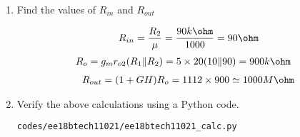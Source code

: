\begin{enumerate}[label=\thesection.\arabic*.,ref=\thesection.\theenumi]
\item
Find the values of $R_{in}$ and $R_{out}$

\solution
\begin{align}
    R_{in}=\frac{R_{2}}{\mu}=\frac{90k\ohm}{1000}=90\ohm
\end{align}
\begin{align}
    R_{o} &=g_{m} r_{o 2}(R_{1} \| R_{2}) =5 \times 20(10 \| 90)=900k\ohm
\end{align}
\begin{align}
    R_{out}=(1+GH) R_{o}=1112 \times 900 \simeq 1000M\ohm
\end{align}

\begin{table}[!ht]
\centering

\caption{}
\label{table: Output_Table}
\end{table}

\item
Verify the above calculations using a Python code.

\solution
\begin{lstlisting}
codes/ee18btech11021/ee18btech11021_calc.py
\end{lstlisting}

\end{enumerate}
